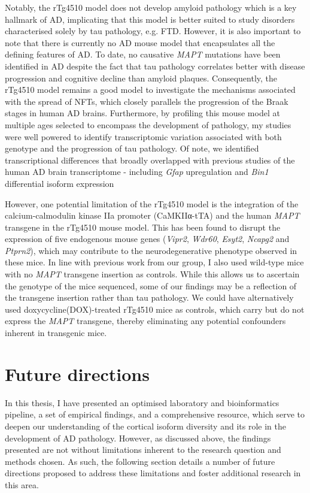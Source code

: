 Notably, the rTg4510 model does not develop amyloid pathology which is a key hallmark of AD, implicating that this model is better suited to study disorders characterised solely by tau pathology, e.g. FTD. However, it is also important to note that there is currently no AD mouse model that encapsulates all the defining features of AD. To date, no causative \textit{MAPT} mutations have been identified in AD despite the fact that tau pathology correlates better with disease progression and cognitive decline than amyloid plaques\cite{Serrano-Pozo2016,Giannakopoulos2003,PV1992}. Consequently, the rTg4510 model remains a good model to investigate the mechanisms associated with the spread of NFTs, which closely parallels the progression of the Braak stages in human AD brains. Furthermore, by profiling this mouse model at multiple ages selected to encompass the development of pathology, my studies were well powered to identify transcriptomic variation associated with both genotype and the progression of tau pathology. Of note, we identified transcriptional differences that broadly overlapped with previous studies of the human AD brain transcriptome - including \textit{Gfap} upregulation and \textit{Bin1} differential isoform expression

However, one potential limitation of the rTg4510 model is the integration of the calcium-calmodulin kinase IIa promoter (CaMKIIα-tTA) and the human \textit{MAPT} transgene in the rTg4510 mouse model. This has been found to disrupt the expression of five endogenous mouse genes (\textit{Vipr2}, \textit{Wdr60}, \textit{Esyt2}, \textit{Ncapg2} and \textit{Ptprn2}), which may contribute to the neurodegenerative phenotype observed in these mice\cite{Castanho2020,Gamache2019}. In line with previous work from our group\cite{Castanho2020}, I also used wild-type mice with no \textit{MAPT} transgene insertion as controls. While this allows us to ascertain the genotype of the mice sequenced, some of our findings may be a reflection of the transgene insertion rather than tau pathology. We could have alternatively used doxycycline(DOX)-treated rTg4510 mice as controls, which carry but do not express the \textit{MAPT} transgene, thereby eliminating any potential confounders inherent in transgenic mice. 
 
	
\section{Future directions}
In this thesis, I have presented an optimised laboratory and bioinformatics pipeline, a set of empirical findings, and a comprehensive resource, which serve to deepen our understanding of the cortical isoform diversity and its role in the development of AD pathology. However, as discussed above, the findings presented are not without limitations inherent to the research question and methods chosen. As such, the following section details a number of future directions proposed to address these limitations and foster additional research in this area.   


